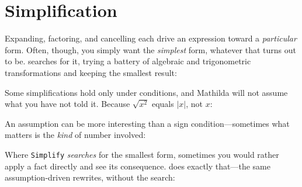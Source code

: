 \section{Simplification}
\label{sec:intro-simplify}

Expanding, factoring, and cancelling each drive an expression toward a \emph{particular}
form. Often, though, you simply want the \emph{simplest} form, whatever that turns out
to be.  searches for it, trying a battery of algebraic and trigonometric
transformations and keeping the smallest result:

\begin{codepairs}
\end{codepairs}

Some simplifications hold only under conditions, and Mathilda will not assume what you
have not told it. Because $\sqrt{x^{2}}$ equals $|x|$, not $x$:

\begin{codepairs}
\end{codepairs}

An assumption can be more interesting than a sign condition---sometimes what matters is
the \emph{kind} of number involved:

\begin{codepairs}
\end{codepairs}

Where \texttt{Simplify} \emph{searches} for the smallest form, sometimes you would rather
apply a fact directly and see its consequence.  does exactly that---the same
assumption-driven rewrites, without the search:

